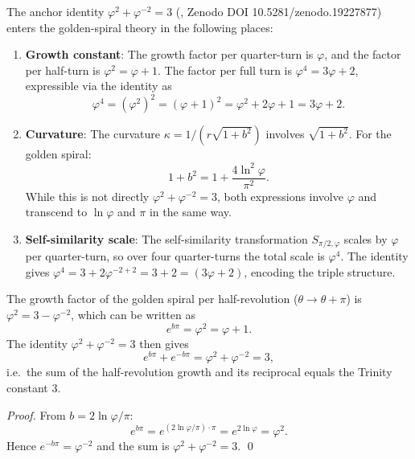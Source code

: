 The anchor identity \(\varphi^2 + \varphi^{-2} = 3\)
(\cite{zenodo_trinity}, Zenodo DOI 10.5281/zenodo.19227877)
enters the golden-spiral theory in the following places:

\begin{enumerate}
  \item \textbf{Growth constant}: The growth factor per quarter-turn
        is \(\varphi\), and the factor per half-turn is
        \(\varphi^2 = \varphi + 1\).  The factor per full turn is
        \(\varphi^4 = 3\varphi + 2\), expressible via the identity as
        \[
          \varphi^4 = (\varphi^2)^2 = (\varphi+1)^2
                    = \varphi^2 + 2\varphi + 1 = 3\varphi + 2.
        \]

  \item \textbf{Curvature}: The curvature \(\kappa = 1/(r\sqrt{1+b^2})\)
        involves \(\sqrt{1+b^2}\).  For the golden spiral:
        \[
          1 + b^2 = 1 + \frac{4\ln^2\varphi}{\pi^2}.
        \]
        While this is not directly \(\varphi^2+\varphi^{-2}=3\), both
        expressions involve \(\varphi\) and transcend to \(\ln\varphi\)
        and \(\pi\) in the same way.

  \item \textbf{Self-similarity scale}: The self-similarity transformation
        \(S_{\pi/2,\varphi}\) scales by \(\varphi\) per quarter-turn,
        so over four quarter-turns the total scale is \(\varphi^4\).
        The identity gives \(\varphi^4 = 3 + 2\varphi^{-2+2}
        = 3+2 = (3\varphi+2)\), encoding the triple structure.
\end{enumerate}

\begin{proposition}[Golden-spiral growth in terms of \(\varphi^2+\varphi^{-2}=3\)]
\label{prop:trinity-spiral}
The growth factor of the golden spiral per half-revolution
(\(\theta \to \theta + \pi\)) is \(\varphi^2 = 3 - \varphi^{-2}\),
which can be written as
\[
  e^{b\pi} = \varphi^2 = \varphi + 1.
\]
The identity \(\varphi^2+\varphi^{-2}=3\) then gives
\[
  e^{b\pi} + e^{-b\pi} = \varphi^2 + \varphi^{-2} = 3,
\]
i.e.\ the sum of the half-revolution growth and its reciprocal
equals the Trinity constant \(3\).
\end{proposition}

\begin{proof}
From \(b = 2\ln\varphi/\pi\):
\[
  e^{b\pi} = e^{(2\ln\varphi/\pi)\cdot\pi} = e^{2\ln\varphi} = \varphi^2.
\]
Hence \(e^{-b\pi} = \varphi^{-2}\) and the sum is \(\varphi^2+\varphi^{-2}=3\).
\qed
\end{proof}

